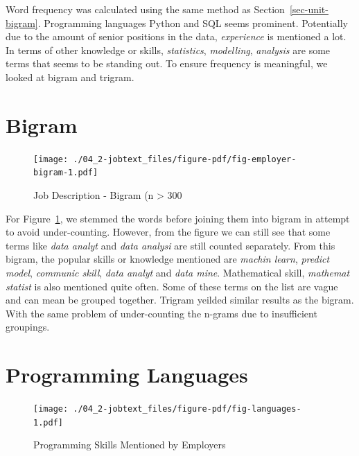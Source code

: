\documentclass[
  letterpaper,
  DIV=11,
  numbers=noendperiod]{scrreport}
\begin{document}
Word frequency was calculated using the same method as
Section~\ref{sec-unit-bigram}. Programming languages Python and SQL
seems prominent. Potentially due to the amount of senior positions in
the data, \emph{experience} is mentioned a lot. In terms of other
knowledge or skills, \emph{statistics}, \emph{modelling},
\emph{analysis} are some terms that seems to be standing out. To ensure
frequency is meaningful, we looked at bigram and trigram.

\hypertarget{bigram}{%
\section{Bigram}\label{bigram}}

\begin{figure}

{\centering \texttt{[image: ./04\_2-jobtext\_files/figure-pdf/fig-employer-bigram-1.pdf]}

}

\caption{\label{fig-employer-bigram}Job Description - Bigram (n
\textgreater{} 300}

\end{figure}

For Figure~\ref{fig-employer-bigram}, we stemmed the words before
joining them into bigram in attempt to avoid under-counting. However,
from the figure we can still see that some terms like \emph{data analyt}
and \emph{data analysi} are still counted separately. From this bigram,
the popular skills or knowledge mentioned are \emph{machin learn},
\emph{predict model}, \emph{communic skill}, \emph{data analyt} and
\emph{data mine}. Mathematical skill, \emph{mathemat statist} is also
mentioned quite often. Some of these terms on the list are vague and can
mean be grouped together. Trigram yeilded similar results as the bigram.
With the same problem of under-counting the n-grams due to insufficient
groupings.

\hypertarget{programming-languages}{%
\section{Programming Languages}\label{programming-languages}}

\begin{figure}

{\centering \texttt{[image: ./04\_2-jobtext\_files/figure-pdf/fig-languages-1.pdf]}

}

\caption{\label{fig-languages}Programming Skills Mentioned by Employers}

\end{figure}
\end{document}
